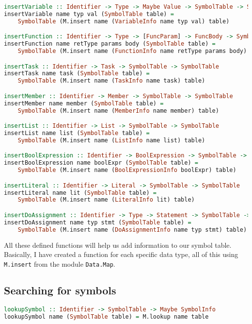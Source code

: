 \documentclass{article}
\newcommand{\code}[1]{\colorbox{codebackground}{\texttt{#1}}}
\begin{document}
\begin{lstlisting}[language=Haskell]
insertVariable :: Identifier -> Type -> Maybe Value -> SymbolTable -> SymbolTable
insertVariable name typ val (SymbolTable table) = 
    SymbolTable (M.insert name (VariableInfo name typ val) table)

insertFunction :: Identifier -> Type -> [FuncParam] -> FuncBody -> SymbolTable -> SymbolTable
insertFunction name retType params body (SymbolTable table) =
    SymbolTable (M.insert name (FunctionInfo name retType params body) table)

insertTask :: Identifier -> Task -> SymbolTable -> SymbolTable
insertTask name task (SymbolTable table) =
    SymbolTable (M.insert name (TaskInfo name task) table)

insertMember :: Identifier -> Member -> SymbolTable -> SymbolTable
insertMember name member (SymbolTable table) =
    SymbolTable (M.insert name (MemberInfo name member) table)

insertList :: Identifier -> List -> SymbolTable -> SymbolTable
insertList name list (SymbolTable table) =
    SymbolTable (M.insert name (ListInfo name list) table)

insertBoolExpression :: Identifier -> BoolExpression -> SymbolTable -> SymbolTable
insertBoolExpression name boolExpr (SymbolTable table) =
    SymbolTable (M.insert name (BoolExpressionInfo boolExpr) table)

insertLiteral :: Identifier -> Literal -> SymbolTable -> SymbolTable
insertLiteral name lit (SymbolTable table) =
    SymbolTable (M.insert name (LiteralInfo lit) table)

insertDoAssignment :: Identifier -> Type -> Statement -> SymbolTable -> SymbolTable
insertDoAssignment name typ stmt (SymbolTable table) = 
    SymbolTable (M.insert name (DoAssignmentInfo name typ stmt) table)
\end{lstlisting}

All these defined functions will help us add information to our symbol table. Basically, I have created a function for each specific data type, all of this using \code{M.insert} from the module \code{Data.Map}.

\subsection{Searching for symbols}

\begin{lstlisting}[language=Haskell]
lookupSymbol :: Identifier -> SymbolTable -> Maybe SymbolInfo
lookupSymbol name (SymbolTable table) = M.lookup name table
\end{lstlisting}
\end{document}
